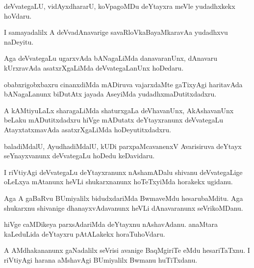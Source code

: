 \documentclass{article}
\begin{document}
\begin{mng}%
deVvategaLU, vidAyxdhararU, koVpagoMDu deYtayxra meVle yudadhxkekx hoVdaru.
\end{mng}

\begin{mng}%
I samayadalilx A deVvadAnavarige savaRloVkaBayaMkaravAa yudadhxvu naDeyitu.
\end{mng}

\begin{mng}%
Aga deVvategaLu ugarxvAda bANagaLiMda danavaranUnx, dAnavaru kUrxravAda asatxrXgaLiMda 
deVvategaLanUnx hoDedaru.
\end{mng}

\begin{mng}%
obabxrigobxbaxru cinanxdiMda mADiruva vajarxdaMte gaTixyAgi haritavAda bANagaLanunx biDutAtx 
jayada AseyiMda yudadhxmaDutitxdadxru.
\end{mng}

\begin{mng}%
A kAMtiyuLaLx sharagaLiMda shaturxgaLa deVhavanUnx, AkAshavanUnx beLaku mADutitxdadxru hiVge 
mADutatx deYtayxranunx deVvategaLu AtayxtatxmavAda asatxrXgaLiMda hoDeyutitxdadxru.
\end{mng}

\begin{mng}%
baladiMdalU, AyudhadiMdalU, kUDi parxpaMcavanenxV Avarisiruva deYtayx seYnayxvanunx deVvategaLu 
hoDedu keDavidaru.
\end{mng}

\begin{mng}%
I riVtiyAgi deVvategaLu deYtayxranunx nAshamADalu shivanu deVvategaLige oLeLxya mAtanunx heVLi 
shukarxnanunx hoTeTxyiMda horakekx ugidanu.
\end{mng}

\begin{mng}%
Aga A gaBaRvu BUmiyalilx bidudxdariMda BwmaveMdu hesarubaMditu. Aga shukarxnu shivanige 
dhanayxvAdavanunx heVLi dAnavaranunx seVrikoMDanu.
\end{mng}

\begin{mng}%
hiVge caMDikeya parxsAdariMda deYtayxnu nAshavAdanu. anaMtara kaLeduLida deYtayxru pAtALakekx 
horaTuhoVdaru.
\end{mng}

\begin{mng}%
A AMdhakananunx gaNadalilx seVrisi avanige BaqMgiriTe eMdu hesariTaTxnu. I riVtiyAgi harana 
aMshavAgi BUmiyalilx Bwmanu huTiTxdanu.
\end{mng}
\end{document}
